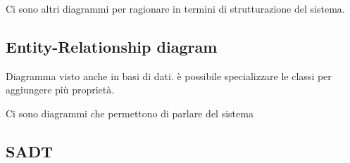 Ci sono altri diagrammi per ragionare in termini di 
strutturazione del sistema.
\subsection{Entity-Relationship diagram}
Diagramma visto anche in basi di dati.
è possibile specializzare le classi per aggiungere più 
proprietà.

Ci sono diagrammi che permettono di parlare del sistema
\subsection{SADT}

